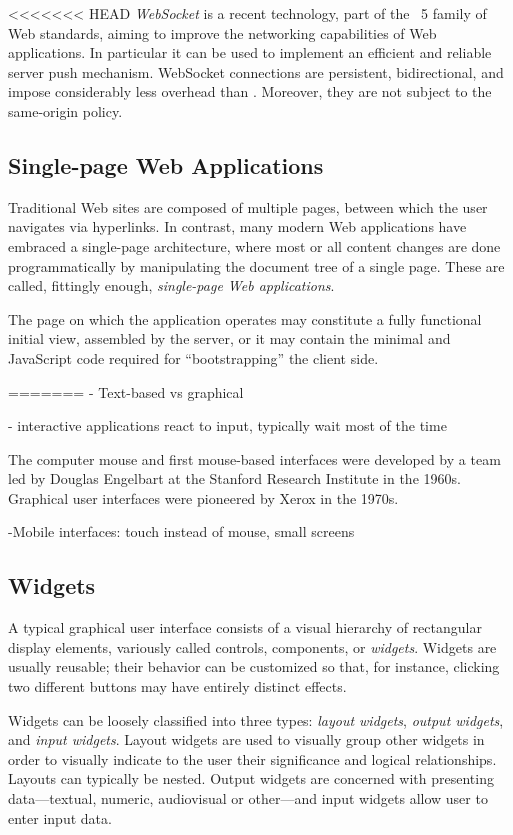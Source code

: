 <<<<<<< HEAD
\emph{WebSocket} is a recent technology, part of the ~5 family of Web standards, aiming to improve the networking capabilities of Web applications. In particular it can be used to implement an efficient and reliable server push mechanism. WebSocket connections are persistent, bidirectional, and impose considerably less overhead than . Moreover, they are not subject to the same-origin policy.

\subsection{Single-page Web Applications}

Traditional Web sites are composed of multiple pages, between which the user navigates via hyperlinks. In contrast, many modern Web applications have embraced a single-page architecture, where most or all content changes are done programmatically by manipulating the document tree of a single  page. These are called, fittingly enough, \emph{single-page Web applications}.

The page on which the application operates may constitute a fully functional initial view, assembled by the server, or it may contain the minimal  and JavaScript code required for ``bootstrapping'' the client side.

=======
- Text-based vs graphical

- interactive applications react to input, typically wait most of the time

The computer mouse and first mouse-based interfaces were developed by a team led by Douglas Engelbart at the Stanford Research Institute in the \num{1960s}. Graphical user interfaces were pioneered by Xerox in the \num{1970s}.

-Mobile interfaces: touch instead of mouse, small screens

\subsection{Widgets}

A typical graphical user interface consists of a visual hierarchy of rectangular display elements, variously called controls, components, or \emph{widgets}. Widgets are usually reusable; their behavior can be customized so that, for instance, clicking two different buttons may have entirely distinct effects.

Widgets can be loosely classified into three types: \emph{layout widgets}, \emph{output widgets}, and \emph{input widgets}. Layout widgets are used to visually group other widgets in order to visually indicate to the user their significance and logical relationships. Layouts can typically be nested. Output widgets are concerned with presenting data---textual, numeric, audiovisual or other---and input widgets allow user to enter input data.

